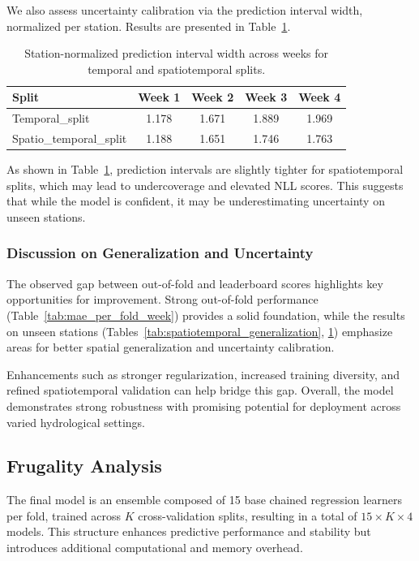 \documentclass[a4paper,12pt]{article}
\begin{document}
We also assess uncertainty calibration via the prediction interval width, normalized per station. Results are presented in Table~\ref{tab:normalized_interval_width}.

\begin{table}[ht]
\centering
\begin{tabular}{lcccc}
\hline
\textbf{Split} & \textbf{Week 1} & \textbf{Week 2} & \textbf{Week 3} & \textbf{Week 4} \\
\hline
Temporal\_split & 1.178 & 1.671 & 1.889 & 1.969 \\
Spatio\_temporal\_split & 1.188 & 1.651 & 1.746 & 1.763 \\
\hline
\end{tabular}
\caption{Station-normalized prediction interval width across weeks for temporal and spatiotemporal splits.}
\label{tab:normalized_interval_width}
\end{table}

\noindent As shown in Table~\ref{tab:normalized_interval_width}, prediction intervals are slightly tighter for spatiotemporal splits, which may lead to undercoverage and elevated NLL scores. This suggests that while the model is confident, it may be underestimating uncertainty on unseen stations.

\subsubsection{Discussion on Generalization and Uncertainty}

The observed gap between out-of-fold and leaderboard scores highlights key opportunities for improvement. Strong out-of-fold performance (Table~\ref{tab:mae_per_fold_week}) provides a solid foundation, while the results on unseen stations (Tables~\ref{tab:spatiotemporal_generalization}, \ref{tab:normalized_interval_width}) emphasize areas for better spatial generalization and uncertainty calibration.

Enhancements such as stronger regularization, increased training diversity, and refined spatiotemporal validation can help bridge this gap. Overall, the model demonstrates strong robustness with promising potential for deployment across varied hydrological settings.


\subsection{Frugality Analysis}
\label{sec:frugality}
The final model is an ensemble composed of 15 base chained regression learners per fold, trained across $K$ cross-validation splits, resulting in a total of $15 \times K \times 4$  models. This structure enhances predictive performance and stability but introduces additional computational and memory overhead.
\end{document}
